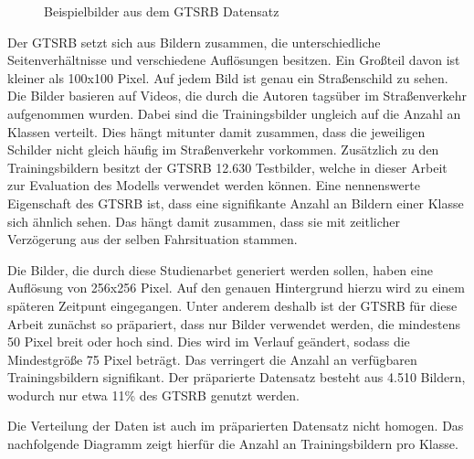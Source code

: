 \begin{figure}[H]
\begin{subfigure}[b]{0.125\textwidth}
    \caption{}
    \label{fig:gtrsb-paper-bsp-image-4}
\end{subfigure}
      \caption{Beispielbilder aus dem \acs{GTSRB} Datensatz \cite{GTSRB}}
      \label{fig:gtrsb-paper-bsp-images}
\end{figure}

Der \ac{GTSRB} setzt sich aus Bildern zusammen, die unterschiedliche Seitenverhältnisse und verschiedene Auflösungen besitzen. Ein Großteil davon ist kleiner als 100x100 Pixel. Auf jedem Bild ist genau ein Straßenschild zu sehen. Die Bilder basieren auf Videos, die durch die Autoren tagsüber im Straßenverkehr aufgenommen wurden. Dabei sind die Trainingsbilder ungleich auf die Anzahl an Klassen verteilt. Dies hängt mitunter damit zusammen, dass die jeweiligen Schilder nicht gleich häufig im Straßenverkehr vorkommen. Zusätzlich zu den Trainingsbildern besitzt der \ac{GTSRB} 12.630 Testbilder, welche in dieser Arbeit zur Evaluation des Modells verwendet werden können. Eine nennenswerte Eigenschaft des \ac{GTSRB} ist, dass eine signifikante Anzahl an Bildern einer Klasse sich ähnlich sehen. Das hängt damit zusammen, dass sie mit zeitlicher Verzögerung aus der selben Fahrsituation stammen. \cite{GTSRB}

Die Bilder, die durch diese Studienarbet generiert werden sollen, haben eine Auflösung von 256x256 Pixel. Auf den genauen Hintergrund hierzu wird zu einem späteren Zeitpunt eingegangen. Unter anderem deshalb ist der \ac{GTSRB} für diese Arbeit zunächst so präpariert, dass nur Bilder verwendet werden, die mindestens 50 Pixel breit oder hoch sind. Dies wird im Verlauf geändert, sodass die Mindestgröße 75 Pixel beträgt. Das verringert die Anzahl an verfügbaren Trainingsbildern signifikant. Der präparierte Datensatz besteht aus 4.510 Bildern, wodurch nur etwa 11\% des \ac{GTSRB} genutzt werden.

Die Verteilung der Daten ist auch im präparierten Datensatz nicht homogen. Das nachfolgende Diagramm zeigt hierfür die Anzahl an Trainingsbildern pro Klasse.




